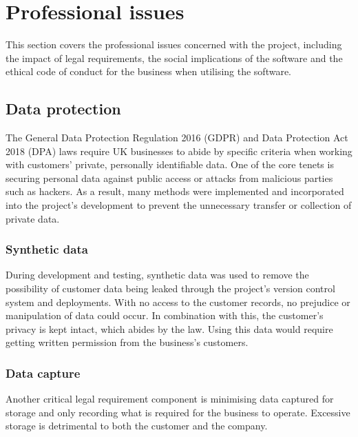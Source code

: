 \chapter{Professional issues} %
\label{Chapter6} %

This section covers the professional issues concerned with the project, including the impact of legal requirements, the social implications of the software and the ethical code of conduct for the business when utilising the software.



\section{Data protection}
The General Data Protection Regulation 2016 (GDPR) and Data Protection Act 2018 (DPA) laws require UK businesses to abide by specific criteria when working with customers' private, personally identifiable data. One of the core tenets is securing personal data against public access or attacks from malicious parties such as hackers. As a result, many methods were implemented and incorporated into the project's development to prevent the unnecessary transfer or collection of private data.


\subsection{Synthetic data}
During development and testing, synthetic data was used to remove the possibility of customer data being leaked through the project's version control system and deployments. With no access to the customer records, no prejudice or manipulation of data could occur. In combination with this, the customer's privacy is kept intact, which abides by the law. Using this data would require getting written permission from the business's customers.


\subsection{Data capture}
Another critical legal requirement component is minimising data captured for storage and only recording what is required for the business to operate. Excessive storage is detrimental to both the customer and the company. 

